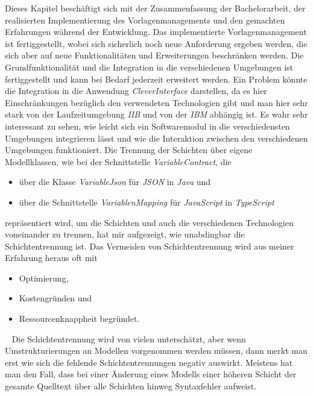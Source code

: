 Dieses Kapitel beschäftigt sich mit der Zusammenfassung der Bachelorarbeit, der realisierten Implementierung des Vorlagenmanagements und den gemachten Erfahrungen während der Entwicklung. Das implementierte Vorlagenmanagement ist fertiggestellt, wobei sich sicherlich noch neue Anforderung ergeben werden, die sich aber auf neue Funktionalitäten und Erweiterungen beschränken werden. Die Grundfunktionalität und die Integration in die verschiedenen Umgebungen ist fertiggestellt und kann bei Bedarf jederzeit erweitert werden. Ein Problem könnte die Integration in die Anwendung \emph{CleverInterface} darstellen, da es hier Einschränkungen bezüglich den verwendeten Technologien gibt und man hier sehr stark von der Laufzeitumgebung \emph{IIB} und von der \emph{IBM} abhängig ist. 
\newline
\newline
Es wahr sehr interessant zu sehen, wie leicht sich ein Softwaremodul in die verschiedensten Umgebungen integrieren lässt und wie die Interaktion zwischen den verschiedenen Umgebungen funktioniert. Die Trennung der Schichten über eigene Modellklassen, wie bei der Schnittstelle \emph{VariableContract}, die 
\begin{itemize}
	\item über die Klasse \emph{VariableJson} für \emph{JSON} in \emph{Java} und
	\item über die Schnittstelle \emph{VariablenMapping} für \emph{JavaScript} in \emph{TypeScript}
\end{itemize}
repräsentiert wird, um die Schichten und auch die verschiedenen Technologien voneinander zu trennen, hat mir aufgezeigt, wie unabdingbar die Schichtentrennung ist. Das Vermeiden von Schichtentrennung wird aus meiner Erfahrung heraus oft mit 
\begin{itemize}
	\item Optimierung,
	\item Kostengründen und
	\item Ressourcenknappheit begründet.
\end{itemize}
\ \newline
Die Schichtentrennung wird von vielen unterschätzt, aber wenn Umstrukturierungen an Modellen vorgenommen werden müssen, dann merkt man erst wie sich die fehlende Schichtentrennungen negativ auswirkt. Meistens hat man den Fall, dass bei einer Änderung eines Modells einer höheren Schicht der gesamte Quelltext über alle Schichten hinweg Syntaxfehler aufweist.
\newline
\newline
